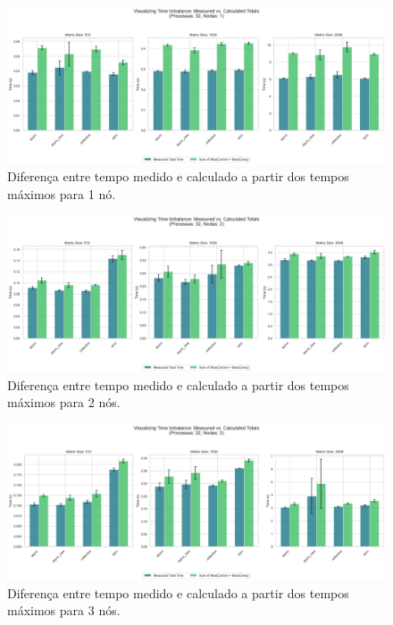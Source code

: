 \documentclass{article}
\begin{document}
\begin{figure}[H]
    \centering
    \includegraphics[width=1.0\linewidth]{images/time_imbalance_1node.png}
    \caption{Diferença entre tempo medido e calculado a partir dos tempos máximos para 1 nó.}
    \label{fig:time_imbalance_1}
\end{figure}

\begin{figure}[H]
    \centering
    \includegraphics[width=1.0\linewidth]{images/time_imbalance_2nodes.png}
    \caption{Diferença entre tempo medido e calculado a partir dos tempos máximos para 2 nós.}
    \label{fig:time_imbalance_2}
\end{figure}

\begin{figure}[H]
    \centering
    \includegraphics[width=1.0\linewidth]{images/time_imbalance_3nodes.png}
    \caption{Diferença entre tempo medido e calculado a partir dos tempos máximos para 3 nós.}
    \label{fig:time_imbalance_3}
\end{figure}
\end{document}
